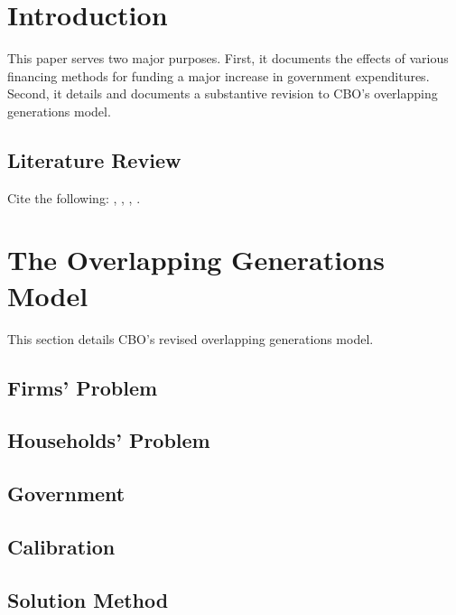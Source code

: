 \documentclass[letterpaper,12pt]{article}
\numberwithin{equation}{section}
\numberwithin{figure}{section}
\numberwithin{table}{section}
\begin{document}
\begin{spacing}{1.5}

\section{Introduction} \label{sec_intro}

	This paper serves two major purposes.  First, it documents the effects of various financing methods for funding a major increase in government expenditures.  Second, it details and documents a substantive revision to CBO's overlapping generations model.

	\subsection{Literature Review} \label{sec_intro_lit}

		Cite the following: \citet{AuerbachKotlikoff1987}, \citet{NishiyamaSmetters:2007}, \citet{NishiyamaReichling:2015}, \citet{NelsonEtal:2019}.


\section{The Overlapping Generations Model} \label{sec_OLGModel}

	This section details CBO's revised overlapping generations model.

	\subsection{Firms' Problem} \label{sec_OLGModel_firms}

	\subsection{Households' Problem} \label{sec_OLGModel_HH}

	\subsection{Government} \label{sec_OLGModel_govt}

	\subsection{Calibration} \label{sec_OLGModel_calib}

	\subsection{Solution Method} \label{sec_OLGModel_soln}



\end{spacing}
\end{document}
